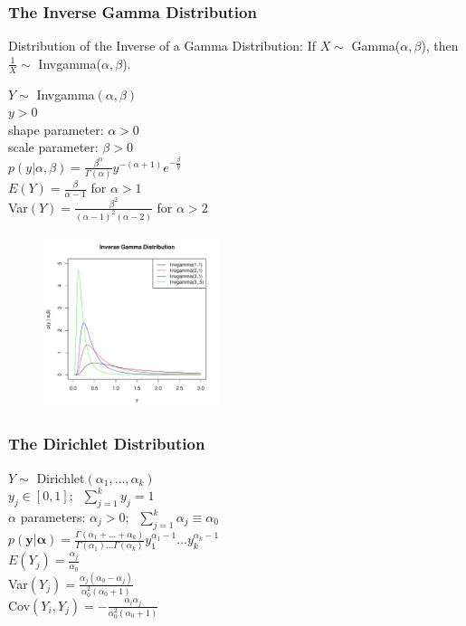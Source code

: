 \documentclass[handout]{beamer}
\begin{document}
\begin{frame}
\frametitle{The Inverse Gamma Distribution}
\pause
Distribution of the Inverse of a Gamma Distribution: \pause If $X \sim$
Gamma($\alpha, \beta$), then $\frac{1}{X} \sim$ Invgamma($\alpha, \beta$).
\begin{multicols}{2}
\pause
$Y \sim$ Invgamma$(\alpha, \beta)$\\
\bigskip
\pause
$y > 0$\\
\bigskip
\pause
shape parameter: $\alpha > 0$\\
\pause
scale parameter: $\beta > 0$\\
\bigskip
\pause
$p(y|\alpha, \beta) = \frac{\beta^\alpha}{\Gamma(\alpha)}
y^{-(\alpha+1)} e^{-\frac{\beta}{y}}$\\
\bigskip
\bigskip
\pause
$E(Y) = \frac{\beta}{\alpha-1}$ for $\alpha > 1$\\
\bigskip
\pause
Var$(Y) = \frac{\beta^2}{(\alpha-1)^2 (\alpha-2)}$ for $\alpha > 2$
\pause


\begin{figure}[!htp]
\begin{center}
\includegraphics[width=2in, height=2in]{probability-invgamma.pdf}
\end{center}
\end{figure}
\end{multicols}
\end{frame}


\begin{frame}
\frametitle{The Dirichlet Distribution}
\pause
$Y \sim$ Dirichlet$(\alpha_1,\dots, \alpha_k)$\\
\bigskip
\pause
$y_j \in [0,1]; \; \; \sum_{j=1}^{k} y_j = 1$\\
\bigskip
\pause
$\alpha$ parameters: $\alpha_j > 0; \; \; \sum_{j=1}^k \alpha_j \equiv
\alpha_0$\\
\bigskip
\pause
$p(\mathbf{y}| \bm{\alpha}) = \frac{\Gamma (\alpha_1 + \dots +
\alpha_k)}{\Gamma (\alpha_1) \dots \Gamma (\alpha_k)} y_1^{\alpha_1 -
1} \dots y_k^{\alpha_k - 1}$\\
\bigskip
\bigskip
\pause
$E(Y_j) = \frac{\alpha_j}{\alpha_0}$\\
\bigskip
\pause
Var$(Y_j) = \frac{\alpha_j (\alpha_0 - \alpha_j)}{\alpha^2_0 (\alpha_0
+ 1)}$\\
\bigskip
\pause
Cov$(Y_i, Y_j) = -\frac{\alpha_i \alpha_j}{\alpha^2_0 (\alpha_0 + 1)}$
\end{frame}
\end{document}
